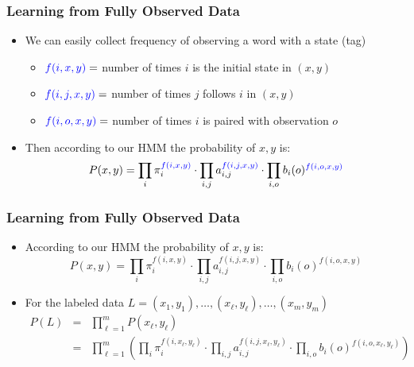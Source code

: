 \begin{frame}
\frametitle{Learning from Fully Observed Data}
\begin{itemize}[<+->]
\item We can easily collect frequency of observing a word with a state (tag)
\begin{itemize}[<+->]
\item ${\color{blue} f(i,x,y)} = $ number of times $i$ is the initial state in $(x,y)$
\item ${\color{blue} f(i,j,x,y)} = $ number of times $j$ follows $i$ in $(x,y)$
\item ${\color{blue} f(i,o,x,y)} = $ number of times $i$ is paired with observation $o$
\end{itemize}
\item Then according to our HMM the probability of $x,y$ is:
\[ P(x,y) = \prod_{i} \pi_i^{{\color{blue} f(i,x,y)}} \cdot \prod_{i,j} a_{i,j}^{{\color{blue} f(i,j,x,y)}} \cdot \prod_{i,o} b_i(o)^{{\color{blue} f(i,o,x,y)}} \]
\end{itemize}
\end{frame}

\begin{frame}
\frametitle{Learning from Fully Observed Data}
\begin{itemize}[<+->]
\item According to our HMM the probability of $x,y$ is:
\[ P(x,y) = \prod_{i} \pi_i^{f(i,x,y)} \cdot \prod_{i,j} a_{i,j}^{f(i,j,x,y)} \cdot \prod_{i,o} b_i(o)^{f(i,o,x,y)} \]
\item For the labeled data $L = (x_1, y_1), \ldots, (x_\ell, y_\ell), \ldots, (x_m, y_m)$
\begin{eqnarray*}
P(L) &=& \prod_{\ell=1}^m P(x_\ell, y_\ell) \\
&=& \prod_{\ell=1}^m \left( \prod_{i} \pi_i^{f(i,x_\ell,y_\ell)} \cdot \prod_{i,j} a_{i,j}^{f(i,j,x_\ell,y_\ell)} \cdot \prod_{i,o} b_i(o)^{f(i,o,x_\ell,y_\ell)} \right)
\end{eqnarray*}
\end{itemize}
\end{frame}

